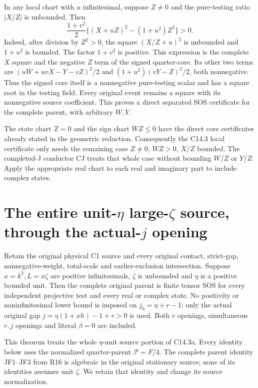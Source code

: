In any local chart with $u$ infinitesimal, suppose $Z\ne0$ and
the pure-testing ratio $|X/Z|$ is unbounded.  Then
\[
 \frac{1+v^2}{2}\{(X+uZ)^2-(1+u^2)Z^2\}>0.             \tag{DS3}
\]
Indeed, after division by $Z^2>0$, the square $(X/Z+u)^2$
is unbounded and $1+u^2$ is bounded.  The factor $1+v^2$
is positive.  This expression is the complete $X$ square and the
negative $Z$ term of the signed quarter-core.  Its other two
terms are $(uW+uvX-Y-vZ)^2/2$ and
$(1+u^2)(vY-Z)^2/2$, both nonnegative.  Thus the signed core
itself is a nonnegative pure-testing scalar and has a square root
in the testing field.  Every original event remains a square with
its nonnegative source coefficient.  This proves a direct separated
SOS certificate for the complete parent, with arbitrary $W,Y$.

The state chart $Z=0$ and the sign chart $WZ\le0$ have the
direct core certificates already stated in the geometric reduction.
Consequently the C14.3 local certificate only needs the remaining
case $Z\ne0$, $WZ>0$, $X/Z$ bounded.  The completed-J
conductor CJ treats that whole case without bounding $W/Z$ or
$Y/Z$.  Apply the appropriate real chart to each real and imaginary
part to include complex states.


\section{\texorpdfstring{The entire unit-$\eta$ large-$\zeta$ source, through the actual-$j$ opening}{The entire unit-eta large-zeta source, through the actual-j opening}}
\label{component:p60eca5442075}

\label{p60eca5442075:sec:r17-lz-unit-eta}

\begin{theorem}
Retain the original physical C1 source and every original contact,
strict-gap, nonnegative-weight, total-scale and earlier-exclusion
intersection. Suppose $x=k^2,L=x\zeta$ are positive infinitesimals,
$\zeta$ is unbounded and $\eta$ is a positive bounded unit.
Then the complete original parent is finite tensor SOS for every
independent projective test and every real or complex state.
No positivity or noninfinitesimal lower bound is imposed on
$j_0=\eta+r-1$: only the actual original gap
$j=\eta(1+xh)-1+r>0$ is used. Both $r$ openings, simultaneous
$r,j$ openings and literal $\beta=0$ are included.
\end{theorem}

This theorem treats the whole $\eta$-unit source portion of C14.3a.
Every identity below uses the normalized quarter-parent $\mathcal P=F/4$.
The complete parent identity JF1--JF3 from R16 is algebraic in the
original stationary source; none of its identities assumes unit
$\zeta$. We retain that identity and change its source normalization.

